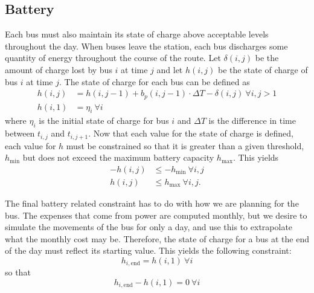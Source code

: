\subsection{Battery}
\par Each bus must also maintain its state of charge above acceptable levels throughout the day.  When buses leave the station, each bus discharges some quantity of energy throughout the course of the route. Let $\delta(i,j)$ be the amount of charge lost by bus $i$ at time $j$ and let $h(i,j)$ be the state of charge of bus $i$ at time $j$. The state of charge for each bus can be defined as
\begin{equation}\begin{aligned}
	h(i,j) &= h(i,j-1) + b_p(i,j - 1)\cdot \Delta T - \delta(i,j) \ \forall i,j>1 \\
	h(i,1) &= \eta_i \ \forall i
\end{aligned}\end{equation}
where $\eta_i$ is the initial state of charge for bus $i$ and $\Delta T$ is the difference in time between $t_{i,j}$ and $t_{i,j+1}$.
Now that each value for the state of charge is defined, each value for $h$ must be constrained so that it is greater than a given threshold, $h_{\text{min}}$ but does not exceed the maximum battery capacity $h_{\text{max}}$. This yields
\begin{equation} \begin{aligned}
	-h(i,j) &\le -h_{\text{min}}\ \forall i,j \\
	h(i,j) &\le h_{\text{max}} \ \forall i,j. 
\end{aligned}\end{equation}
\par The final battery related constraint has to do with how we are planning for the bus.  The expenses that come from power are computed monthly, but we desire to simulate the movements of the bus for only a day, and use this to extrapolate what the monthly cost may be.  Therefore, the state of charge for a bus at the end of the day must reflect its starting value.  This yields the following constraint:
\begin{equation*}
	h_{i,\text{end}} = h(i,1) \ \forall i
\end{equation*}
so that
\begin{equation}
	h_{i,\text{end}} - h(i,1)  = 0 \ \forall i
\end{equation}

